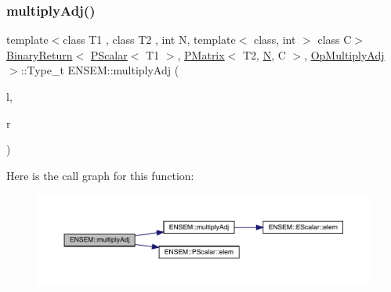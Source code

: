 \subsubsection{\texorpdfstring{multiplyAdj()}{multiplyAdj()}\hspace{0.1cm}{\footnotesize\ttfamily [2/3]}}
{\footnotesize\ttfamily template$<$class T1 , class T2 , int N, template$<$ class, int $>$ class C$>$ \\
\mbox{\hyperlink{structENSEM_1_1BinaryReturn}{Binary\+Return}}$<$ \mbox{\hyperlink{classENSEM_1_1PScalar}{P\+Scalar}}$<$ T1 $>$, \mbox{\hyperlink{classENSEM_1_1PMatrix}{P\+Matrix}}$<$ T2, \mbox{\hyperlink{operator__name__util_8cc_a7722c8ecbb62d99aee7ce68b1752f337}{N}}, C $>$, \mbox{\hyperlink{structENSEM_1_1OpMultiplyAdj}{Op\+Multiply\+Adj}} $>$\+::Type\+\_\+t E\+N\+S\+E\+M\+::multiply\+Adj (\begin{DoxyParamCaption}\item[{const \mbox{\hyperlink{classENSEM_1_1PScalar}{P\+Scalar}}$<$ T1 $>$ \&}]{l,  }\item[{const \mbox{\hyperlink{classENSEM_1_1PMatrix}{P\+Matrix}}$<$ T2, \mbox{\hyperlink{operator__name__util_8cc_a7722c8ecbb62d99aee7ce68b1752f337}{N}}, C $>$ \&}]{r }\end{DoxyParamCaption})\hspace{0.3cm}{\ttfamily [inline]}}

Here is the call graph for this function\+:\nopagebreak
\begin{figure}[H]
\begin{center}
\leavevmode
\includegraphics[width=350pt]{df/d0a/group__primmatrix_ga500e40c33d8e7e4a2a95970fb8a56326_cgraph}
\end{center}
\end{figure}
\mbox{\label{group__primmatrix_gaf37104443218a1cbaa8ab848065a0a09}} 
